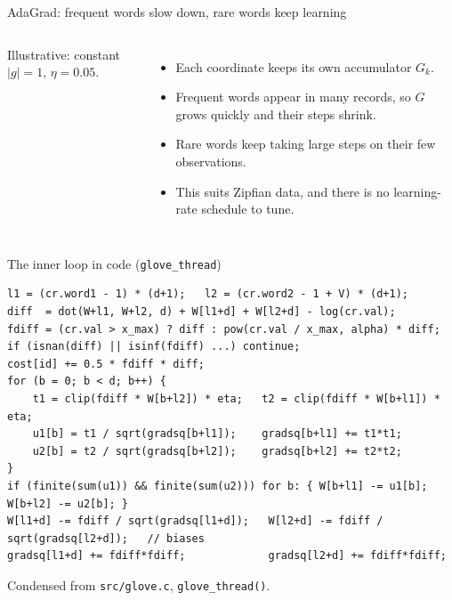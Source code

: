 \documentclass[aspectratio=169,11pt]{beamer}
\newcommand{\file}[1]{\texttt{#1}}
\begin{document}
\begin{frame}{AdaGrad: frequent words slow down, rare words keep learning}
\begin{columns}[c]

{\scriptsize Illustrative: constant $|g|=1$, $\eta=0.05$.}
\small
\begin{itemize}
  \item Each coordinate keeps its own accumulator $G_k$.
  \item Frequent words appear in many records, so $G$ grows quickly and their steps shrink.
  \item Rare words keep taking large steps on their few observations.
  \item This suits Zipfian data, and there is no learning-rate schedule to tune.
\end{itemize}
\end{columns}
\end{frame}

\begin{frame}[fragile]{The inner loop in code (\texttt{glove\_thread})}
\begin{lstlisting}[style=c]
l1 = (cr.word1 - 1) * (d+1);   l2 = (cr.word2 - 1 + V) * (d+1);
diff  = dot(W+l1, W+l2, d) + W[l1+d] + W[l2+d] - log(cr.val);
fdiff = (cr.val > x_max) ? diff : pow(cr.val / x_max, alpha) * diff;
if (isnan(diff) || isinf(fdiff) ...) continue;
cost[id] += 0.5 * fdiff * diff;
for (b = 0; b < d; b++) {
    t1 = clip(fdiff * W[b+l2]) * eta;   t2 = clip(fdiff * W[b+l1]) * eta;
    u1[b] = t1 / sqrt(gradsq[b+l1]);    gradsq[b+l1] += t1*t1;
    u2[b] = t2 / sqrt(gradsq[b+l2]);    gradsq[b+l2] += t2*t2;
}
if (finite(sum(u1)) && finite(sum(u2))) for b: { W[b+l1] -= u1[b]; W[b+l2] -= u2[b]; }
W[l1+d] -= fdiff / sqrt(gradsq[l1+d]);   W[l2+d] -= fdiff / sqrt(gradsq[l2+d]);   // biases
gradsq[l1+d] += fdiff*fdiff;             gradsq[l2+d] += fdiff*fdiff;
\end{lstlisting}
\small Condensed from \file{src/glove.c}, \texttt{glove\_thread()}.
\end{frame}
\end{document}
